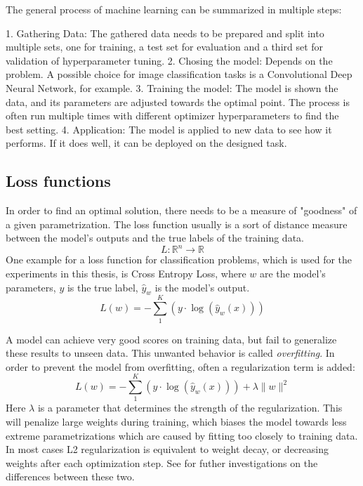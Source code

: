 \documentclass[twoside,12pt,a4paper]{report}
\begin{document}
The general process of machine learning can be summarized in multiple steps:
\\

\begin{markdown}
1. Gathering Data: The gathered data needs to be prepared and split into multiple sets, one for training, a test set for evaluation and a third set for validation of hyperparameter tuning.
2. Chosing the model: Depends on the problem. A possible choice for image classification tasks is a Convolutional Deep Neural Network, for example.
3. Training the model: The model is shown the data, and its parameters are adjusted towards the optimal point. The process is often run multiple times with different optimizer hyperparameters to find the best setting.
4. Application: The model is applied to new data to see how it performs. If it does well, it can be deployed on the designed task.
\end{markdown}

\subsection{Loss functions}
In order to find an optimal solution, there needs to be a measure of "goodness" of a given parametrization.
The loss function usually is a sort of distance measure between the model's outputs and the true labels of the training data.
$$L: \mathbb{R}^n \rightarrow \mathbb{R}$$
One example for a loss function for classification problems, which is used for the experiments in this thesis, is Cross Entropy Loss, where $w$ are the model's parameters, $y$ is the true label, $\hat{y}_w$ is the model's output.
$$L(w) = - \sum_{1}^{K}(y \cdot \log(\hat{y}_w(x)))$$

A model can achieve very good scores on training data, but fail to generalize these results to unseen data. This unwanted behavior is called \textit{overfitting}.
In order to prevent the model from overfitting, often a regularization term is added:
$$L(w) = - \sum_{1}^{K}(y \cdot \log(\hat{y}_w(x) )) + \lambda \| w\|^2 $$
Here $\lambda$ is a parameter that determines the strength of the regularization. This will penalize large weights during training, which biases the model towards less extreme parametrizations which are caused by fitting too closely to training data. In most cases L2 regularization is equivalent to weight decay, or decreasing weights after each optimization step. See \cite{Chaudhari2017entropy} for futher investigations on the differences between these two.
\end{document}
